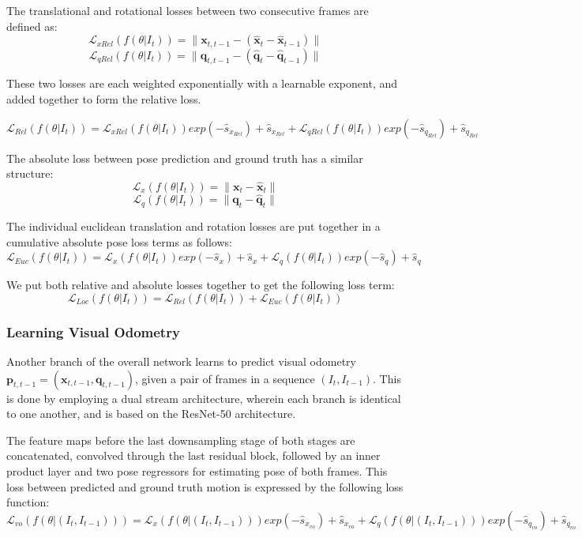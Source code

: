The translational and rotational losses between two consecutive frames are defined as:
\[\mathcal{L}_{xRel}(\mathbf{\mathit{f}}(\theta|\mathit{I}_t)) = \|\mathbf{x}_{t, t-1} - (\hat{\mathbf{x}}_t - \hat{\mathbf{x}}_{t-1})\|\]
\[\mathcal{L}_{qRel}(\mathbf{\mathit{f}}(\theta|\mathit{I}_t)) = \|\mathbf{q}_{t, t-1} - (\hat{\mathbf{q}}_t - \hat{\mathbf{q}}_{t-1})\|\]
 
These two losses are each weighted exponentially with a learnable exponent, and added together to form the relative loss.
 
\[ \mathcal{L}_{Rel}(\mathbf{\mathit{f}}(\theta|\mathit{I}_t)) = \mathcal{L}_{xRel}(\mathbf{\mathit{f}}(\theta|\mathit{I}_t))exp(-\hat{s}_{x_{Rel}}) + \hat{s}_{x_{Rel}}
+ \mathcal{L}_{qRel}(\mathbf{\mathit{f}}(\theta|\mathit{I}_t))exp(-\hat{s}_{q_{Rel}}) + \hat{s}_{q_{Rel}}\]
 
The absolute loss between pose prediction and ground truth has a similar structure:
\[\mathcal{L}_{x}(\mathbf{\mathit{f}}(\theta|\mathit{I}_t)) = \|\mathbf{x}_{t} - \hat{\mathbf{x}}_t\|\]
\[\mathcal{L}_{q}(\mathbf{\mathit{f}}(\theta|\mathit{I}_t)) = \|\mathbf{q}_{t} - \hat{\mathbf{q}}_t\|\]
 
The individual euclidean translation and rotation losses are put together in a cumulative absolute pose loss terms as follows:
\[ \mathcal{L}_{Euc}(\mathbf{\mathit{f}}(\theta|\mathit{I}_t)) = \mathcal{L}_{x}(\mathbf{\mathit{f}}(\theta|\mathit{I}_t))exp(-\hat{s}_{x}) + \hat{s}_{x}
+ \mathcal{L}_{q}(\mathbf{\mathit{f}}(\theta|\mathit{I}_t))exp(-\hat{s}_{q}) + \hat{s}_{q}\]

We put both relative and absolute losses together to get the following loss term:
\[\mathcal{L}_{Loc}(\mathbf{\mathit{f}}(\theta|\mathit{I}_t)) = \mathcal{L}_{Rel}(\mathbf{\mathit{f}}(\theta|\mathit{I}_t)) + \mathcal{L}_{Euc}(\mathbf{\mathit{f}}(\theta|\mathit{I}_t))\]

\subsubsection{Learning Visual Odometry}
Another branch of the overall network learns to predict visual odometry $\mathbf{p}_{t, t-1} = (\mathbf{x}_{t, t-1}, \mathbf{q}_{t, t-1})$, 
given a pair of frames in a sequence $(I_t, I_{t-1})$. This is done by employing a dual stream architecture, wherein each branch is identical to 
one another, and is based on the ResNet-50 architecture. 
 
The feature maps before the last downsampling stage of both stages are concatenated, convolved through the last residual block, followed by an inner product layer
and two pose regressors for estimating pose of both frames. This loss between predicted and ground truth motion is expressed by the following loss function:
\[ \mathcal{L}_{vo}(\mathbf{\mathit{f}}(\theta|(\mathit{I}_t, \mathit{I}_{t-1})
)) = \mathcal{L}_{x}(\mathbf{\mathit{f}}(\theta|(\mathit{I}_t, \mathit{I}_{t-1})
))exp(-\hat{s}_{x_{vo}}) + \hat{s}_{x_{vo}}
+ \mathcal{L}_{q}(\mathbf{\mathit{f}}(\theta|(\mathit{I}_t, \mathit{I}_{t-1})
))exp(-\hat{s}_{q_{vo}}) + \hat{s}_{q_{vo}}\]
  
